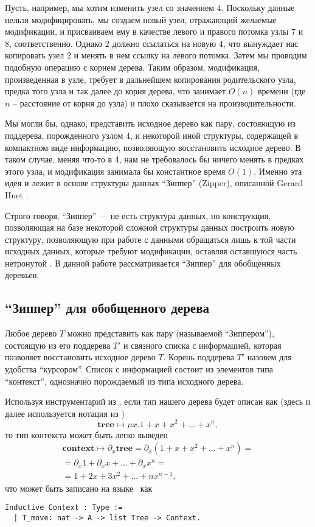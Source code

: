 Пусть, например, мы хотим изменить узел со значением 4. Поскольку данные нельзя модифицировать, мы создаем новый узел, отражающий желаемые модификации, и присваиваем ему в качестве левого и правого потомка узлы 7 и 8, соответственно. Однако 2 должно ссылаться на новую 4, что вынуждает нас копировать узел 2 и менять в нем ссылку на левого потомка. Затем мы проводим подобную операцию с корнем дерева. Таким образом, модификация, произведенная в узле, требует в дальнейшем копирования родительского узла, предка того узла и так далее до корня дерева, что занимает $O(n)$ времени (где $n$ -- расстояние от корня до узла) и плохо сказывается на производительности.

Мы могли бы, однако, представить исходное дерево как пару, состояющую из поддерева, порожденного узлом 4, и некоторой иной структуры, содержащей в компактном виде информацию, позволяющую восстановить исходное дерево. В таком случае, меняя что-то в 4, нам не требовалось бы ничего менять в предках этого узла, и модификация занимала бы константное время $O(1)$. Именно эта идея и лежит в основе структуры данных ``Зиппер'' (Zipper), описанной Gerard Huet \autocite{Huet1997}.

Строго говоря, ``Зиппер'' --- не есть структура данных, но конструкция, позволяющая на базе некоторой сложной структуры данных построить новую структуру, позволяющую при работе с данными обращаться лишь к той части исходных данных, которые требуют модификации, оставляя оставшуюся часть нетронутой \autocite{Huet1997}. В данной работе рассматривается ``Зиппер'' для обобщенных деревьев.

\subsection{``Зиппер'' для обобщенного дерева}

Любое дерево $T$ можно представить как пару (называемой ``Зиппером''), состоящую из его поддерева $T'$ и связного списка с информацией, которая позволяет восстановить исходное дерево $T$. Корень поддерева $T'$ назовем для удобства ``курсором''. Список с информацией состоит из элементов типа ``контекст'', однозначно порождаемый из типа исходного дерева.

Используя инструментарий из \autocite{McBride2009}, если тип нашего дерева будет описан как (здесь и далее используется нотация из \autocite{McBride2009})
\begin{equation*}
\textbf{tree} \mapsto \mu x. 1 + x + x^2 + \dotsc + x^n,
\end{equation*}   
то тип контекста может быть легко выведен
\begin{multline*}
\textbf{context} \mapsto \partial_x \textbf{tree} = \partial_x \left( 1 + x + x^2 + \dotsc + x^n \right)  = \\
= \partial_x 1 + \partial_x x + \dotsc + \partial_x x^n = \\
= 1 + 2x + 3x^2 + \dotsc + nx^{n-1},
\end{multline*}
что может быть записано на языке \tcoq~как
\begin{lstlisting}
Inductive Context : Type :=
  | T_move: nat -> A -> list Tree -> Context.
\end{lstlisting}


